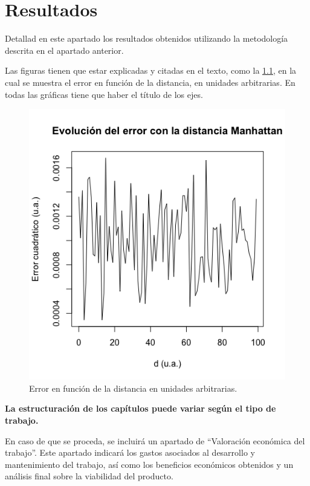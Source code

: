 \documentclass[IB,BIB]{TFUOC}%
\begin{document}
\chapter{Resultados}

Detallad en este apartado los resultados obtenidos utilizando la metodología descrita en el apartado anterior.



Las figuras tienen que estar explicadas y citadas en el texto, como la \ref{fig:my_label}, en la cual se muestra el error en función de la distancia, en unidades arbitrarias. En todas las gráficas tiene que haber el título de los ejes.

\begin{figure}[!htbp]
    \centering
    \includegraphics[width=7truecm]{Rplotmanh.png}
    \caption{Error en función de la distancia en unidades arbitrarias.}
    \label{fig:my_label}
\end{figure}
 
\textbf{La estructuración de los capítulos puede variar según el tipo de trabajo.}  
 
En caso de que se proceda, se incluirá un apartado de “Valoración económica del trabajo”. Este apartado indicará los gastos asociados al desarrollo y mantenimiento del trabajo, así como los beneficios económicos obtenidos y un análisis final sobre la viabilidad del producto.
\end{document}
